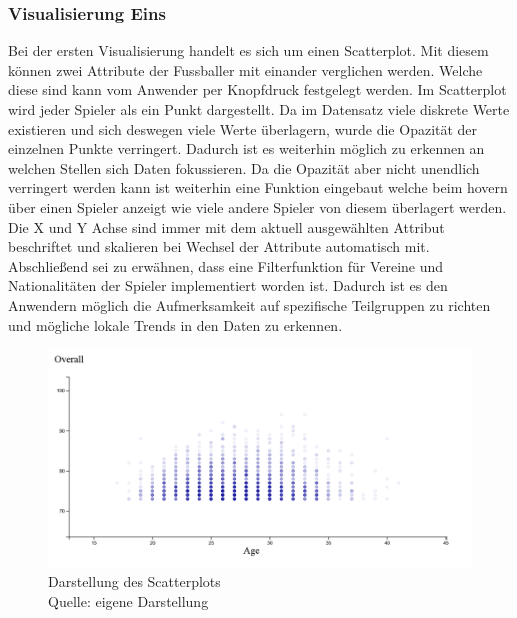 \documentclass[usegeometry=true]{scrartcl}
\begin{document}
\subsubsection{Visualisierung Eins}
Bei der ersten Visualisierung handelt es sich um einen Scatterplot.
Mit diesem können zwei Attribute der Fussballer mit einander verglichen werden. Welche diese sind kann vom Anwender per Knopfdruck festgelegt werden. Im Scatterplot wird jeder Spieler als ein Punkt dargestellt. Da im Datensatz viele diskrete Werte existieren und sich deswegen viele Werte überlagern, wurde die Opazität der einzelnen Punkte verringert. Dadurch ist es weiterhin möglich zu erkennen an welchen Stellen sich Daten fokussieren. Da die Opazität aber nicht unendlich verringert werden kann ist weiterhin eine Funktion eingebaut welche beim hovern über einen Spieler anzeigt wie viele andere Spieler von diesem überlagert werden.
Die X und Y Achse sind immer mit dem aktuell ausgewählten Attribut beschriftet und skalieren bei Wechsel der Attribute automatisch mit.
Abschließend sei zu erwähnen, dass eine Filterfunktion für Vereine und Nationalitäten der Spieler implementiert worden ist. Dadurch ist es den Anwendern möglich die Aufmerksamkeit auf spezifische Teilgruppen zu richten und mögliche lokale Trends in den Daten zu erkennen.
\begin{figure}[h!]
\centering
\includegraphics[scale=0.4]{grafiken/Scatterplot1}
\caption{Darstellung des Scatterplots\\ Quelle: eigene Darstellung}
\label{SP}
\end{figure}
\end{document}
